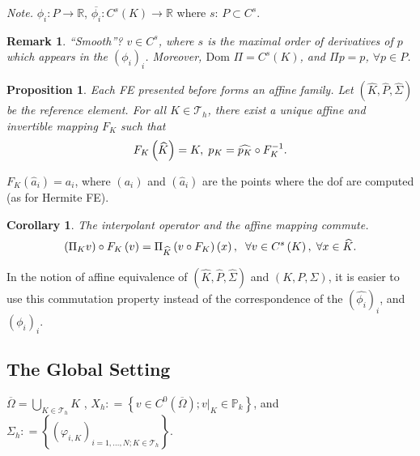 \documentclass[11pt,a4paper,center,notitlepage]{article}
\numberwithin{equation}{section}
\newtheorem{corollary}{Corollary}[section]
\newtheorem{prop}{Proposition}[section]
\newtheorem{remark}{Remark}[section]
\begin{document}
\noindent
\textit{Note.} $\phi _i : P\to \mathbb{R}$, $\overline{\phi _i}: C^s \left(K\right) \to \mathbb{R}$ where $s$: $P\subset C^s$.
\begin{remark}
``Smooth''? $v\in C^s$, where $s$ is the maximal order of derivatives of $p$ which appears in the $\left(\phi _i\right)_i$. Moreover, $\mbox{Dom } \Pi = C^s \left(K\right)$, and $\Pi p=p$, $\forall p\in P$.
\end{remark}

\begin{prop}
Each FE presented before forms an affine family. Let $\left( {\widehat K,\widehat P,\widehat \Sigma } \right)$ be the reference element. For all $K\in \mathcal{T}_h$, there exist a unique  affine and invertible mapping $F_K$ such that
\begin{align}
{F_K}\left( {\widehat K} \right) = K,\hspace{1mm} {p_K} = \widehat {{p_K}} \circ F_K^{ - 1} .
\end{align}
\end{prop}
$F_K\left(\widehat{a}_i\right)=a_i$, where $\left(a_i\right)$ and $\left(\widehat{a}_i\right)$ are the points where the dof are computed (as for Hermite FE).

\begin{corollary}
The interpolant operator and the affine mapping commute. 
\begin{align}
\left( {{\Pi _K}v} \right) \circ {F_K}\left( v \right) = {\Pi _{\widehat K}}\left( {v \circ {F_K}} \right)\left( x \right),\hspace{2mm}\forall v \in {C^s}\left( K \right),\hspace{1mm}\forall x \in \widehat K.
\end{align}
\end{corollary}
In the notion of affine equivalence of $\left( {\widehat K,\widehat P,\widehat \Sigma } \right)$ and $\left(K,P,\Sigma\right)$, it is easier to use this commutation property instead of the correspondence of the $\left(\widehat{\phi_i}\right) _i$, and $\left(\phi _i\right)_i$.

\subsection{The Global Setting}
$\overline \Omega   = \bigcup\nolimits_{K \in {\mathcal{T}_h}} K$ , ${X_h}: = \left\{ {v \in {C^0}\left( {\overline \Omega  } \right);{{\left. v \right|}_K} \in {\mathbb{P}_k}} \right\}$, and ${\Sigma _h}: = \left\{ {{{\left( {{\varphi _{i,K}}} \right)}_{i = 1, \ldots ,N;K \in {\mathcal{T}_h}}}} \right\}$. 
\end{document}
